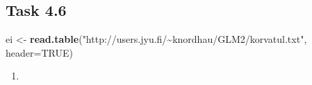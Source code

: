 \documentclass[
]{article}
\newenvironment{Shaded}{\begin{snugshade}}{\end{snugshade}}
\newcommand{\AttributeTok}[1]{\textcolor[rgb]{0.13,0.29,0.53}{#1}}
\newcommand{\ConstantTok}[1]{\textcolor[rgb]{0.56,0.35,0.01}{#1}}
\newcommand{\FunctionTok}[1]{\textcolor[rgb]{0.13,0.29,0.53}{\textbf{#1}}}
\newcommand{\NormalTok}[1]{#1}
\newcommand{\OtherTok}[1]{\textcolor[rgb]{0.56,0.35,0.01}{#1}}
\newcommand{\StringTok}[1]{\textcolor[rgb]{0.31,0.60,0.02}{#1}}
\providecommand{\tightlist}{%
  \setlength{\itemsep}{0pt}\setlength{\parskip}{0pt}}
\begin{document}
\hypertarget{task-4.6}{%
\subsection{Task 4.6}\label{task-4.6}}

\begin{Shaded}
\begin{Highlighting}[]
\NormalTok{ei }\OtherTok{\textless{}{-}} \FunctionTok{read.table}\NormalTok{(}\StringTok{"http://users.jyu.fi/\textasciitilde{}knordhau/GLM2/korvatul.txt"}\NormalTok{, }\AttributeTok{header=}\ConstantTok{TRUE}\NormalTok{)}
\end{Highlighting}
\end{Shaded}

\begin{enumerate}
\def\labelenumi{\alph{enumi})}
\tightlist
\item
\end{enumerate}
\end{document}
